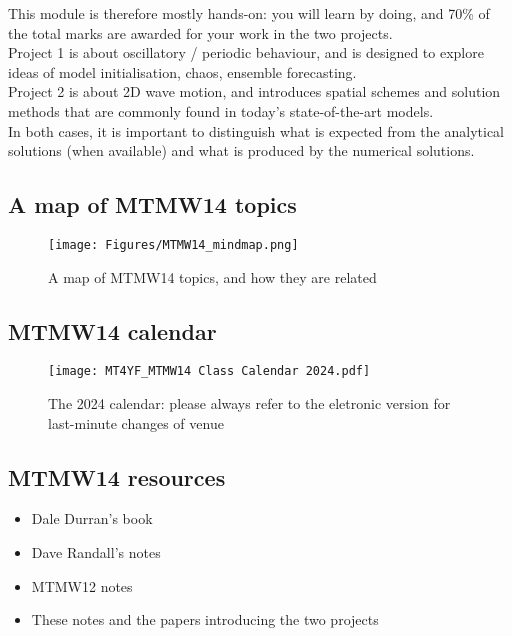 \documentclass[11pt,fleqn]{book} %
\begin{document}
	
	This module is therefore mostly hands-on: you will learn by doing, and 70\% of the total marks are awarded for your work in the two projects.  \\
	
	Project 1 is about oscillatory / periodic behaviour, and is designed to explore ideas of model initialisation, chaos, ensemble forecasting. \\
	
	Project 2 is about 2D wave motion, and introduces spatial schemes and solution methods that are commonly found in today's state-of-the-art models. \\
	
	In both cases, it is important to distinguish what is expected from the analytical solutions (when available) and what is produced by the numerical solutions.
	
	\subsection{A map of MTMW14 topics}
	\begin{figure}
	\texttt{[image: Figures/MTMW14\_mindmap.png]}
	\caption{A map of MTMW14 topics, and how they are related}
	\end{figure}
	
	\subsection{MTMW14 calendar}
	
	
	\begin{figure}
	\texttt{[image: MT4YF\_MTMW14 Class Calendar 2024.pdf]}
	\caption{The 2024 calendar: please always refer to the eletronic version for last-minute changes of venue}
	\end{figure}
	
	\subsection{MTMW14 resources}
	
	\begin{itemize}
		\item	Dale Durran's book
		\item	Dave Randall's notes
		\item	MTMW12 notes
		\item	These notes and the papers introducing the two projects
	\end{itemize}
	
\end{document}
